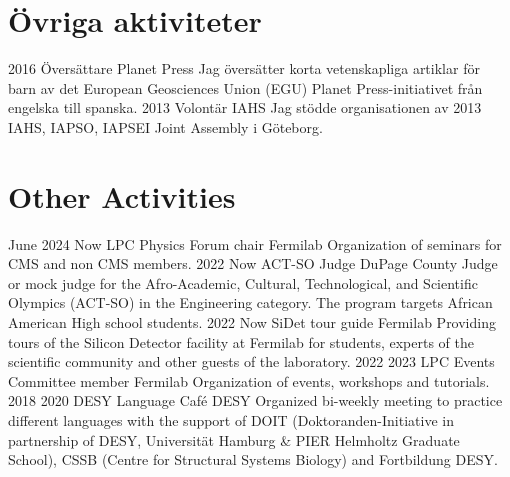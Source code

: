\ifswedish
  \section{Övriga aktiviteter}
    \position
      {2016 \textemdash{}}
      {Översättare}
      {Planet Press}
      {Jag översätter korta vetenskapliga artiklar för barn av det European Geosciences Union (EGU) Planet Press-initiativet från engelska till spanska.}
    \position
      {2013}
      {Volontär}
      {IAHS}
      {Jag stödde organisationen av 2013 IAHS, IAPSO, IAPSEI Joint Assembly i Göteborg.}
\else
  \section{Other Activities}
     \position
      {June 2024 \textemdash{} Now} 
      {LPC Physics Forum chair}
      {Fermilab}
      {Organization of seminars for CMS and non CMS members.}
     \position
      {2022 \textemdash{} Now} 
      {ACT-SO Judge}
      {DuPage County}
      {Judge or mock judge for the Afro-Academic, Cultural, Technological, and Scientific Olympics (ACT-SO) in the Engineering category. The program targets African American High school students.}
     \position
      {2022 \textemdash{} Now} 
      {SiDet tour guide}
      {Fermilab}
      {Providing tours of the Silicon Detector facility at Fermilab for students, experts of the scientific community and other guests of the laboratory.}
      \position
      {2022 \textemdash{} 2023} 
      {LPC Events Committee member}
      {Fermilab}
      {Organization of events, workshops and tutorials.}
    \position
      {2018 \textemdash{} 2020} 
      {DESY Language Café}
      {DESY}
      {Organized bi-weekly meeting to practice different languages with the support of DOIT (Doktoranden-Initiative in partnership of DESY, Universität Hamburg \&  PIER Helmholtz Graduate School), CSSB (Centre for Structural Systems Biology) and Fortbildung DESY.}
\fi
